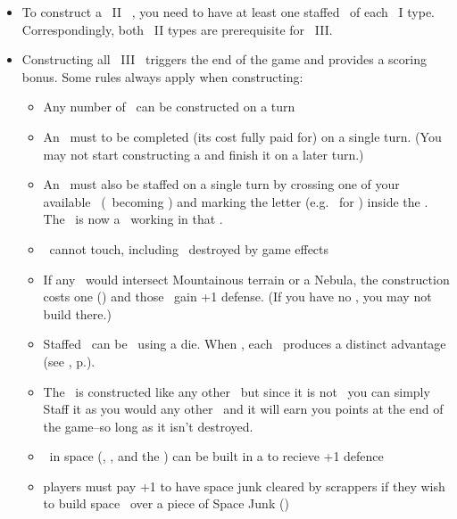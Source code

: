 \begin{itemize}
	\item To construct a \level\ II \armament\ , you need to have at least one 
        staffed \armament\ of each \level\ I type.  Correspondingly, both 
        \level\ II types are prerequisite for \level\ III.
	\item Constructing all \level\ III \armaments\ triggers the end of the game 
        and provides a scoring bonus.  Some rules always apply when 
        constructing:
  \begin{itemize}
    \item Any number of \armaments\ can be constructed on a turn
    \item An \armament\ must to be completed (its cost fully paid for) on a 
          single turn. (You may not start constructing a \armament and finish it
          on a later turn.)
    \item An \armament\ must also be staffed on a single turn by crossing one of
          your available \astronauts\ (\gainastronautsymbol\ becoming 
          \useastronautsymbol) and marking the letter (e.g. \academysymbol\ for
          \academy) inside the \armament. The \astronaut\ is now a \specialist\ 
          working in that \armament.
    \item \armaments\ cannot touch, including \armaments\ destroyed by game 
          effects
    \item If any \armaments\ would intersect Mountainous terrain or a Nebula, 
          the construction costs one (\spendcurrency) \currency and those 
          \armaments\ gain +1 defense. (If you have no \currency, you may not 
          build there.)  
		\item Staffed \armaments\ can be \activated\ using a die.  When \activated, 
          each \armament\ produces a distinct advantage (see , 
          p.\pageref{sec:armaments}).
	  \item The \spacestation\ is constructed like any other \armaments\ but since
          it is not \activated\ you can simply Staff it as you would any other 
          \armaments\ and it will earn you points at the end of the game--so 
          long as it isn't destroyed.
	  \item \armaments\ in space (\starships, \battleships, and the \spacestation)
          can be built in a \nebula to recieve +1 defence
	  \item players must pay +1 to have space junk cleared by scrappers if they 
          wish to build space \armaments\ over a piece of Space Junk (\spacejunksymbol)

\end{itemize}
\end{itemize}
